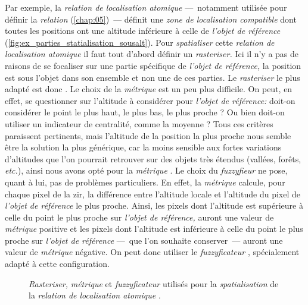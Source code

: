 %   

Par exemple, la \emph{relation de localisation atomique}
 ---~notamment utilisée pour définir
la \emph{relation} 
(\autoref{chap:05})~--- définit une \emph{zone de localisation
  compatible} dont toutes les positions ont une altitude inférieure à
celle de \emph{l'objet de référence}
(\autoref{fig:ex_parties_statialisation_sousalt}). Pour
\emph{spatialiser} cette \emph{relation de localisation atomique} il
faut tout d'abord définir un \emph{rasteriser.} Ici il n'y a pas de
raisons de se focaliser sur une partie spécifique de \emph{l'objet de
  référence,} la position est sous l'objet dans son ensemble et non
une de ces parties. Le \emph{rasteriser} le plus adapté est donc
. Le choix de la \emph{métrique} est un peu plus
difficile. On peut, en effet, se questionner sur l'altitude à
considérer pour \emph{l'objet de référence:} doit-on considérer le
point le plus haut, le plus bas, le plus proche ? Ou bien doit-on
utiliser un indicateur de centralité, comme la moyenne ? Tous ces
critères paraissent pertinents, mais l'altitude de la position la plus
proche nous semble être la solution la plus générique, car la moins
sensible aux fortes variations d'altitudes que l'on pourrait retrouver
sur des objets très étendus (\eg vallées, forêts, \emph{etc.}), ainsi
nous avons opté pour la \emph{métrique}
. Le choix du \emph{fuzzyfieur} ne
pose, quant à lui, pas de problèmes particuliers. En effet, la
\emph{métrique}  calcule, pour chaque
pixel de la \ac{zir}, la différence entre l'altitude locale et
l'altitude du pixel de \emph{l'objet de référence} le plus
proche. Ainsi, les pixels dont l'altitude est supérieure à celle du
point le plus proche sur \emph{l'objet de référence,} auront une
valeur de \emph{métrique} positive et les pixels dont l'altitude est
inférieure à celle du point le plus proche sur \emph{l'objet de
  référence} ---~que l'on souhaite conserver~--- auront une valeur de
\emph{métrique} négative. On peut donc utiliser le
\emph{fuzzyficateur} , spécialement adapté à
cette configuration.

\begin{figure}
  \centering
  
  \caption{\emph{Rasteriser,} \emph{métrique} et \emph{fuzzyficateur}
    utilisés pour la \emph{spatialisation} de la \emph{relation de
      localisation atomique}
    \protect{}.}
  \label{fig:ex_parties_statialisation_sousalt}
\end{figure}


